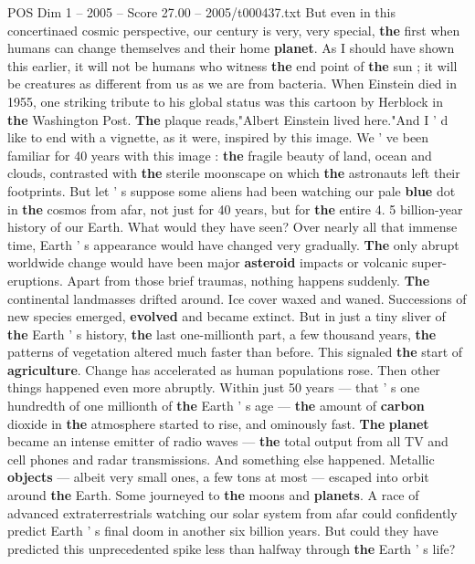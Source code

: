 \begin{textsample}{POS Dim 1 – 2005 – Score 27.00 – 2005/t000437.txt}
But even in this concertinaed cosmic perspective, our century is very, very special, \textbf{the} first when humans can change themselves and their home \textbf{planet}.
As I should have shown this earlier, it will not be humans who witness \textbf{the} end point of \textbf{the} sun ; it will be creatures as different from us as we are from bacteria.
When Einstein died in 1955, one striking tribute to his global status was this cartoon by Herblock in \textbf{the} Washington Post. \textbf{The} plaque reads,"Albert Einstein lived here."And I ' d like to end with a vignette, as it were, inspired by this image.
We ' ve been familiar for 40 years with this image : \textbf{the} fragile beauty of land, ocean and clouds, contrasted with \textbf{the} sterile moonscape on which \textbf{the} astronauts left their footprints.
But let ' s suppose some aliens had been watching our pale \textbf{blue} dot in \textbf{the} cosmos from afar, not just for 40 years, but for \textbf{the} entire 4. 5 billion-year history of our Earth.
What would they have seen?
Over nearly all that immense time, Earth ' s appearance would have changed very gradually. \textbf{The} only abrupt worldwide change would have been major \textbf{asteroid} impacts or volcanic super-eruptions.
Apart from those brief traumas, nothing happens suddenly. \textbf{The} continental landmasses drifted around.
Ice cover waxed and waned.
Successions of new species emerged, \textbf{evolved} and became extinct.
But in just a tiny sliver of \textbf{the} Earth ' s history, \textbf{the} last one-millionth part, a few thousand years, \textbf{the} patterns of vegetation altered much faster than before.
This signaled \textbf{the} start of \textbf{agriculture}.
Change has accelerated as human populations rose.
Then other things happened even more abruptly.
Within just 50 years — that ' s one hundredth of one millionth of \textbf{the} Earth ' s age — \textbf{the} amount of \textbf{carbon} dioxide in \textbf{the} atmosphere started to rise, and ominously fast. \textbf{The} \textbf{planet} became an intense emitter of radio waves — \textbf{the} total output from all TV and cell phones and radar transmissions.
And something else happened.
Metallic \textbf{objects} — albeit very small ones, a few tons at most — escaped into orbit around \textbf{the} Earth.
Some journeyed to \textbf{the} moons and \textbf{planets}.
A race of advanced extraterrestrials watching our solar system from afar could confidently predict Earth ' s final doom in another six billion years.
But could they have predicted this unprecedented spike less than halfway through \textbf{the} Earth ' s life?

\end{textsample}
